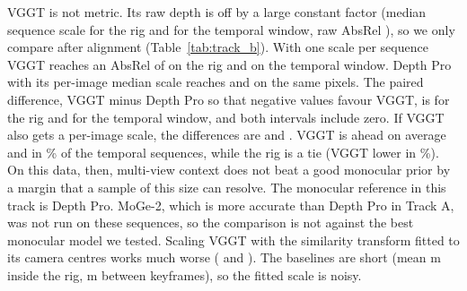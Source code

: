 \documentclass[10pt]{article}
\begin{document}
\begin{table}[t]
\centering
\caption{Track B: AbsRel, $\delta_1$ and RMSE on the LiDAR pixels of the reference view, mean over \BRignSeq{} sequences per setting with 95\% bootstrap intervals. VGGT and Depth Pro are scored on identical pixels.}
\label{tab:track_b}
\end{table}

VGGT is not metric. Its raw depth is off by a large constant factor (median sequence scale
\BRigscaleSeqMedian{} for the rig and \BTempscaleSeqMedian{} for the temporal window, raw AbsRel
\BRigVggtRawabsrel), so we only compare after alignment (Table~\ref{tab:track_b}). With one scale per
sequence VGGT reaches an AbsRel of \BRigVggtSeqabsrel{} on the rig and \BTempVggtSeqabsrel{} on the
temporal window. Depth Pro with its per-image median scale reaches \BRigDpImgabsrel{} and
\BTempDpImgabsrel{} on the same pixels. The paired difference, VGGT minus Depth Pro so that negative values
favour VGGT, is \BRigpairedSeq{} for the rig and \BTemppairedSeq{} for the temporal window, and both
intervals include zero. If VGGT also gets a per-image scale, the differences are \BRigpairedImg{} and
\BTemppairedImg. VGGT is ahead on average and in \BTempfracVggtLower\% of the temporal sequences, while the
rig is a tie (VGGT lower in \BRigfracVggtLower\%). On this data, then, multi-view context does not beat a
good monocular prior by a margin that a sample of this size can resolve. The monocular reference in this
track is Depth Pro. MoGe-2, which is more accurate than Depth Pro in Track A, was not run on these
sequences, so the comparison is not against the best monocular model we tested. Scaling VGGT with the similarity
transform fitted to its camera centres works much worse (\BRigVggtSimabsrel{} and \BTempVggtSimabsrel).
The baselines are short (mean \BRigbaselineMean{} m inside the rig, \BTempbaselineMean{} m between
keyframes), so the fitted scale is noisy.

\begin{table}[t]
\centering
{}
\caption{Relative pose of VGGT against nuScenes ego poses and calibration: rotation error and translation direction error in degrees. Translation direction is evaluated only where the true baseline exceeds \BTempminBaseline{} m; ``excluded'' counts the stationary pairs; ``seq. scale'' is the median sequence scale factor.}
\label{tab:track_b_pose}
\end{table}
\end{document}
